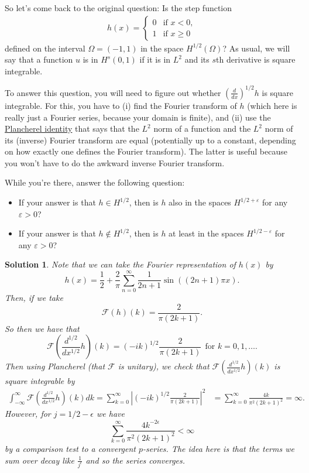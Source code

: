 \documentclass[leqno]{article}
\theoremstyle{nonumberplain}
\newtheorem{solution}{Solution}
\begin{document}
So let's come back to the original question: Is the step function
\begin{align*}
  h(x)
  =
  \begin{cases} 
    0 & \text{if $x<0$}, \\
    1 & \text{if $x\ge 0$}
  \end{cases}
\end{align*}
defined on the interval $\Omega=(-1,1)$ in the space
$H^{1/2}(\Omega)$? As usual, we will say that a function $u$ is in
$H^s(0,1)$ if it is in $L^2$ and its $s$th derivative is square
integrable.

To answer this question, you will need
to figure out whether $\left(\frac{d}{dx}\right)^{1/2} h$ is square
integrable. For this, you have to (i) find the Fourier transform of
$h$ (which here is really just a Fourier series, because your domain
is finite), and (ii) use the
\href{https://en.wikipedia.org/wiki/Plancherel_theorem}{Plancherel
  identity} that says that the $L^2$ norm of a function and the $L^2$
norm of its (inverse) Fourier transform are equal (potentially up to a
constant, depending on how exactly one defines the Fourier
transform). The latter is useful because you won't have to do the
awkward inverse Fourier transform.

While you're there, answer the following question:
\begin{itemize}
  \item If your answer is that $h\in H^{1/2}$, then is $h$ also in the
    spaces $H^{1/2+\varepsilon}$ for any $\varepsilon>0$?
  \item If your answer is that $h\not\in H^{1/2}$, then is $h$ at
    least in the spaces $H^{1/2-\varepsilon}$ for any $\varepsilon>0$?
\end{itemize}

\begin{solution}
Note that we can take the Fourier representation of $h(x)$ by
\[
h(x) = \frac{1}{2} + \frac{2}{\pi} \sum_{n=0}^\infty \frac{1}{2n+1} \sin((2n+1)\pi x).
\]
Then, if we take
\[
\mathcal{F}(h)(k) = \frac{2}{\pi (2k+1)}.
\]
So then we have that
\[
\mathcal{F}\left(\frac{d^{1/2}}{dx^{1/2}}h\right)(k) = (-ik)^{1/2} \frac{2}{\pi(2k+1)} ~~\textrm{for $k=0,1,\dots$}.
\]
Then using Plancherel (that $\mathcal{F}$ is unitary), we check that $\mathcal{F}\left(\frac{d^{1/2}}{dx^{1/2}}h\right)(k)$ is square integrable by
\begin{align*}
\int_{-\infty}^\infty \mathcal{F}\left(\frac{d^{1/2}}{dx^{1/2}}h\right)(k) dk = \sum_{k=0}^\infty \left|(-ik)^{1/2} \frac{2}{\pi(2k+1)}\right|^2 &= \sum_{k=0}^\infty \frac{4k}{\pi^2(2k+1)^2} = \infty.
\end{align*}
However, for $j=1/2-\epsilon$ we have
\[
\sum_{k=0}^\infty \frac{4k^{-2\epsilon}}{\pi^2(2k+1)^2}<\infty
\]
by a comparison test to a convergent $p$-series.  The idea here is that the terms we sum over decay like $\frac{1}{j^\epsilon}$ and so the series converges.

\end{solution}
\pagebreak
\end{document}
